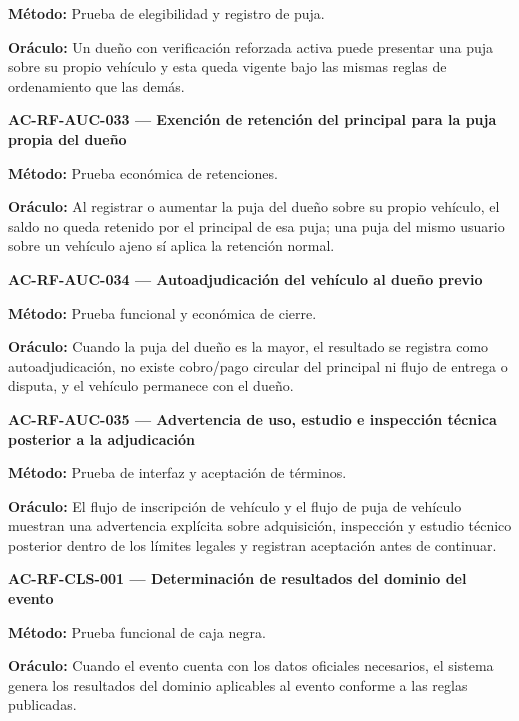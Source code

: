 \documentclass[10pt,letterpaper]{article}
\begin{document}
\textbf{Método:} Prueba de elegibilidad y registro de puja.\par
\textbf{Oráculo:} Un dueño con verificación reforzada activa puede presentar una puja sobre su propio vehículo y esta queda vigente bajo las mismas reglas de ordenamiento que las demás.\par\vspace{0.45em}
\noindent\textbf{AC-RF-AUC-033 --- Exención de retención del principal para la puja propia del dueño}\par
\textbf{Método:} Prueba económica de retenciones.\par
\textbf{Oráculo:} Al registrar o aumentar la puja del dueño sobre su propio vehículo, el saldo no queda retenido por el principal de esa puja; una puja del mismo usuario sobre un vehículo ajeno sí aplica la retención normal.\par\vspace{0.45em}
\noindent\textbf{AC-RF-AUC-034 --- Autoadjudicación del vehículo al dueño previo}\par
\textbf{Método:} Prueba funcional y económica de cierre.\par
\textbf{Oráculo:} Cuando la puja del dueño es la mayor, el resultado se registra como autoadjudicación, no existe cobro/pago circular del principal ni flujo de entrega o disputa, y el vehículo permanece con el dueño.\par\vspace{0.45em}
\noindent\textbf{AC-RF-AUC-035 --- Advertencia de uso, estudio e inspección técnica posterior a la adjudicación}\par
\textbf{Método:} Prueba de interfaz y aceptación de términos.\par
\textbf{Oráculo:} El flujo de inscripción de vehículo y el flujo de puja de vehículo muestran una advertencia explícita sobre adquisición, inspección y estudio técnico posterior dentro de los límites legales y registran aceptación antes de continuar.\par\vspace{0.45em}
\noindent\textbf{AC-RF-CLS-001 --- Determinación de resultados del dominio del evento}\par
\textbf{Método:} Prueba funcional de caja negra.\par
\textbf{Oráculo:} Cuando el evento cuenta con los datos oficiales necesarios, el sistema genera los resultados del dominio aplicables al evento conforme a las reglas publicadas.\par\vspace{0.45em}
\end{document}
